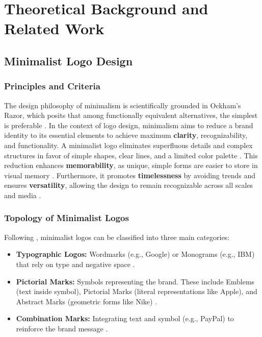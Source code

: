 \section{Theoretical Background and Related Work}\label{sec:grundlagen}

\subsection{Minimalist Logo Design}\label{subsec:minimalistisches_logodesign}
\subsubsection*{Principles and Criteria}\label{subsubsec:prinzipien_und_kriterien}

The design philosophy of minimalism is scientifically grounded in Ockham's Razor, which posits that among functionally equivalent alternatives, the simplest is preferable \cite[172]{Lidwell2010}. In the context of logo design, minimalism aims to reduce a brand identity to its essential elements to achieve maximum \textbf{clarity}, recognizability, and functionality. A minimalist logo eliminates superfluous details and complex structures in favor of simple shapes, clear lines, and a limited color palette \cite[52]{Wheeler2017}. This reduction enhances \textbf{memorability}, as unique, simple forms are easier to store in visual memory \cite[2]{hjalmarsson2021impact}. Furthermore, it promotes \textbf{timelessness} by avoiding trends \cite[40]{Wheeler2017} and ensures \textbf{versatility}, allowing the design to remain recognizable across all scales and media \cite[44]{Wheeler2017}.

\subsubsection*{Topology of Minimalist Logos}\label{subsubsec:die_topologie_der_marken}
Following \citet[51]{Wheeler2017}, minimalist logos can be classified into three main categories:
\begin{itemize}
	\item \textbf{Typographic Logos:} Wordmarks (e.g., Google) or Monograms (e.g., IBM) that rely on type and negative space \cite[68]{Lupton2010}.
	\item \textbf{Pictorial Marks:} Symbols representing the brand. These include Emblems (text inside symbol), Pictorial Marks (literal representations like Apple), and Abstract Marks (geometric forms like Nike) \cite{rashgraphic2024}.
	\item \textbf{Combination Marks:} Integrating text and symbol (e.g., PayPal) to reinforce the brand message \cite{rashgraphic2024}.
\end{itemize}

